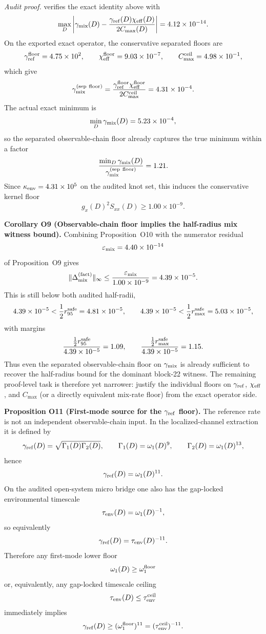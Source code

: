 \documentclass[aps,prd,onecolumn,notitlepage,nofootinbib,superscriptaddress,11pt,floatfix]{revtex4-2}
\begin{document}
\textit{Audit proof.}  verifies the exact identity above with
\[
\max_D\left|
\gamma_{\rm mix}(D)-\frac{\gamma_{\rm ref}(D)\chi_{\rm eff}(D)}{2C_{\max}(D)}
\right|
=
4.12\times10^{-14}.
\]
On the exported exact operator, the conservative separated floors are
\[
\gamma_{\rm ref}^{\rm floor}=4.75\times10^{2},
\qquad
\chi_{\rm eff}^{\rm floor}=9.03\times10^{-7},
\qquad
C_{\max}^{\rm ceil}=4.98\times10^{-1},
\]
which give
\[
\gamma_{\rm mix}^{\rm(sep\ floor)}
=
\frac{\gamma_{\rm ref}^{\rm floor}\chi_{\rm eff}^{\rm floor}}{2C_{\max}^{\rm ceil}}
=4.31\times10^{-4}.
\]
The actual exact minimum is
\[
\min_D\gamma_{\rm mix}(D)=5.23\times10^{-4},
\]
so the separated observable-chain floor already captures the true minimum within a factor
\[
\frac{\min_D\gamma_{\rm mix}(D)}{\gamma_{\rm mix}^{\rm(sep\ floor)}}=1.21.
\]
Since $\kappa_{\rm env}=4.31\times10^{5}$ on the audited knot set, this induces the conservative kernel floor
\[
g_x(D)^2S_{xx}(D)\ge 1.00\times10^{-9}.
\]

\medskip\noindent\textbf{Corollary O9 (Observable-chain floor implies the half-radius mix witness bound).}
Combining Proposition~O10 with the numerator residual
\[
\varepsilon_{\rm mix}=4.40\times10^{-14}
\]
of Proposition~O9 gives
\[
\|\Delta_{\rm mix}^{\rm(fact)}\|_\infty
\le
\frac{\varepsilon_{\rm mix}}{1.00\times10^{-9}}
=4.39\times10^{-5}.
\]
This is still below both audited half-radii,
\[
4.39\times10^{-5}<\frac12 r_{95}^{\rm safe}=4.81\times10^{-5},
\qquad
4.39\times10^{-5}<\frac12 r_{\max}^{\rm safe}=5.03\times10^{-5},
\]
with margins
\[
\frac{\tfrac12 r_{95}^{\rm safe}}{4.39\times10^{-5}}=1.09,
\qquad
\frac{\tfrac12 r_{\max}^{\rm safe}}{4.39\times10^{-5}}=1.15.
\]
Thus even the separated observable-chain floor on $\gamma_{\rm mix}$ is already sufficient to recover the half-radius bound for the dominant block-22 witness. The remaining proof-level task is therefore yet narrower: justify the individual floors on $\gamma_{\rm ref}$, $\chi_{\rm eff}$, and $C_{\max}$ (or a directly equivalent mix-rate floor) from the exact operator side.

\medskip\noindent\textbf{Proposition O11 (First-mode source for the \texorpdfstring{$\gamma_{\rm ref}$}{gamma_ref} floor).}
The reference rate is not an independent observable-chain input. In the localized-channel extraction it is defined by
\[
\gamma_{\rm ref}(D)=\sqrt{\Gamma_1(D)\Gamma_2(D)},
\qquad
\Gamma_1(D)=\omega_1(D)^9,
\qquad
\Gamma_2(D)=\omega_1(D)^{13},
\]
hence
\[
\gamma_{\rm ref}(D)=\omega_1(D)^{11}.
\]
On the audited open-system micro bridge one also has the gap-locked environmental timescale
\[
\tau_{\rm env}(D)=\omega_1(D)^{-1},
\]
so equivalently
\[
\gamma_{\rm ref}(D)=\tau_{\rm env}(D)^{-11}.
\]
Therefore any first-mode lower floor
\[
\omega_1(D)\ge \omega_1^{\rm floor}
\]
or, equivalently, any gap-locked timescale ceiling
\[
\tau_{\rm env}(D)\le \tau_{\rm env}^{\rm ceil}
\]
immediately implies
\[
\gamma_{\rm ref}(D)\ge (\omega_1^{\rm floor})^{11}=(\tau_{\rm env}^{\rm ceil})^{-11}.
\]
\end{document}
